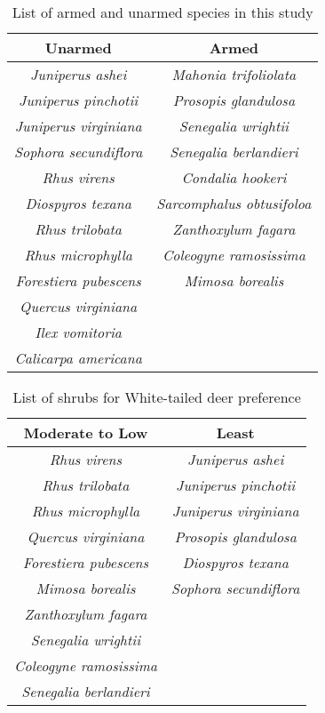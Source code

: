 \documentclass[12pt]{report}
\begin{document}
\begin{table}
    \centering
    \begin{tabular}{c | c}
          Unarmed &  Armed \\
          \hline
          \emph{Juniperus ashei} & \emph{Mahonia trifoliolata}\\
          \emph{Juniperus pinchotii} & \emph{Prosopis glandulosa}\\
          \emph{Juniperus virginiana} & \emph{Senegalia wrightii}\\
          \emph{Sophora secundiflora} & \emph{Senegalia berlandieri}\\
          \emph{Rhus virens} & \emph{Condalia hookeri}\\
          \emph{Diospyros texana} & \emph{Sarcomphalus obtusifoloa}\\
          \emph{Rhus trilobata} & \emph{Zanthoxylum fagara}\\
          \emph{Rhus microphylla} & \emph{Coleogyne ramosissima}\\
          \emph{Forestiera pubescens} & \emph{Mimosa borealis}\\
          \emph{Quercus virginiana} &   \\
          \emph{Ilex vomitoria} &    \\
          \emph{Calicarpa americana} & \\
    \end{tabular}
    \caption{List of armed and unarmed species in this study}
\end{table} 

\begin{table}
    \centering
    \begin{tabular}{c | c}
     Moderate to Low & Least \\
     \hline
    \emph{Rhus virens} & \emph{Juniperus ashei} \\
    \emph{Rhus trilobata} & \emph{Juniperus pinchotii}\\
    \emph{Rhus microphylla} & \emph{Juniperus virginiana}\\
    \emph{Quercus virginiana} & \emph{Prosopis glandulosa}\\
    \emph{Forestiera pubescens} & \emph{Diospyros texana}\\
    \emph{Mimosa borealis} & \emph{Sophora secundiflora}\\
    \emph{Zanthoxylum fagara} &   \\
    \emph{Senegalia wrightii} & \\
    \emph{Coleogyne ramosissima} & \\
    \emph{Senegalia berlandieri} & \\
    \end{tabular}
    \caption{List of shrubs for White-tailed deer preference \citep*{wright2003white}}
\end{table}
\end{document}
